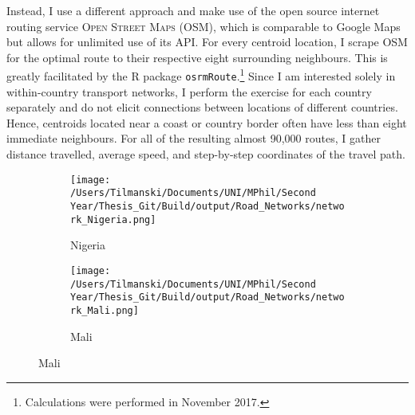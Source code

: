 \documentclass[11pt, oneside]{article}   	%
\begin{document}
Instead, I use a different approach and make use of the open source internet routing service \textsc{Open Street Maps} (OSM), which is comparable to Google Maps but allows for unlimited use of its API. For every centroid location, I scrape OSM for the optimal route to their respective eight surrounding neighbours. This is greatly facilitated by the R package \texttt{osrmRoute}.\footnote{Calculations were performed in November 2017.} Since I am interested solely in within-country transport networks, I perform the exercise for each country separately and do not elicit connections between locations of different countries. Hence, centroids located near a coast or country border often have less than eight immediate neighbours. For all of the resulting almost 90,000 routes, I gather distance travelled, average speed, and step-by-step coordinates of the travel path.

\begin{figure}[t]
\centering
\caption{Road Networks for different countries as scraped off OSM}

\begin{subfigure}[c]{0.48\textwidth}
\texttt{[image: /Users/Tilmanski/Documents/UNI/MPhil/Second Year/Thesis\_Git/Build/output/Road\_Networks/network\_Nigeria.png]}
\caption{Nigeria}
\label{fig:nigeria_roads}
\end{subfigure}
\begin{subfigure}[c]{0.48\textwidth}
\texttt{[image: /Users/Tilmanski/Documents/UNI/MPhil/Second Year/Thesis\_Git/Build/output/Road\_Networks/network\_Mali.png]}
\caption{Mali}
\label{fig:Mali_roads}
\end{subfigure}
\label{fig:roads}
\end{figure}
\end{document}
